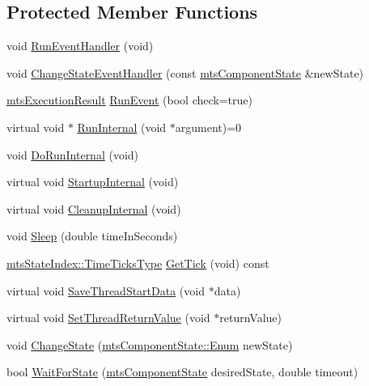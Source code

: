 \subsection*{Protected Member Functions}
\begin{DoxyCompactItemize}
\item 
void \hyperlink{classmts_task_a3ffb50ec20611c1372c1ef2fc7c252eb}{Run\-Event\-Handler} (void)
\item 
void \hyperlink{classmts_task_a8e7150ceb2934cc1b0d685f249c7c5c1}{Change\-State\-Event\-Handler} (const \hyperlink{classmts_component_state}{mts\-Component\-State} \&new\-State)
\item 
\hyperlink{classmts_execution_result}{mts\-Execution\-Result} \hyperlink{classmts_task_a6bc857ef1d6f98c90f55846e940e00c3}{Run\-Event} (bool check=true)
\item 
virtual void $\ast$ \hyperlink{classmts_task_affcd896841ecfe785f898ef93a4202e9}{Run\-Internal} (void $\ast$argument)=0
\item 
void \hyperlink{classmts_task_a4f73416a80c5a7601a5cf3fce0167da5}{Do\-Run\-Internal} (void)
\item 
virtual void \hyperlink{classmts_task_a6816f8dfc6124376896318ebcdd4832b}{Startup\-Internal} (void)
\item 
virtual void \hyperlink{classmts_task_aba518c256e0c623e1e826cc7c76fe8eb}{Cleanup\-Internal} (void)
\item 
void \hyperlink{classmts_task_acaccf2da6d6f8f26c65657656d572131}{Sleep} (double time\-In\-Seconds)
\item 
\hyperlink{classmts_state_index_a80d0a5acdec3b616347ddea2912b6294}{mts\-State\-Index\-::\-Time\-Ticks\-Type} \hyperlink{classmts_task_a6beb5091a65dd8c7b501701a72cd5057}{Get\-Tick} (void) const 
\item 
virtual void \hyperlink{classmts_task_a194fbc7a2dba85f02d80b85bf84ad26c}{Save\-Thread\-Start\-Data} (void $\ast$data)
\item 
virtual void \hyperlink{classmts_task_a89f212237d9b7e453c91df8a1a6962d2}{Set\-Thread\-Return\-Value} (void $\ast$return\-Value)
\item 
void \hyperlink{classmts_task_a320a9995ca33358c5c334862b6fdf7a2}{Change\-State} (\hyperlink{classmts_component_state_a1158e4d2d79fff671354909e87f58928}{mts\-Component\-State\-::\-Enum} new\-State)
\item 
bool \hyperlink{classmts_task_a2153a26a4a92583bae49696501da212e}{Wait\-For\-State} (\hyperlink{classmts_component_state}{mts\-Component\-State} desired\-State, double timeout)
\end{DoxyCompactItemize}
